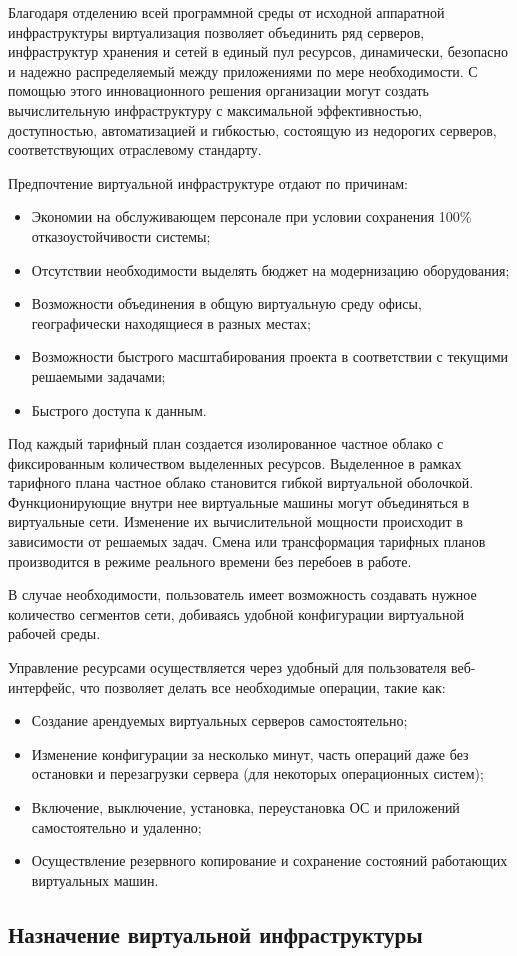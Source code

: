Благодаря отделению всей программной среды от исходной аппаратной инфраструктуры виртуализация позволяет объединить ряд серверов, инфраструктур хранения и сетей в единый пул ресурсов, динамически, безопасно и надежно распределяемый между приложениями по мере необходимости.
С помощью этого инновационного решения организации могут создать вычислительную инфраструктуру с максимальной эффективностью, доступностью, автоматизацией и гибкостью, состоящую из недорогих серверов, соответствующих отраслевому стандарту.

Предпочтение виртуальной инфраструктуре отдают по причинам:
\begin{itemize}
  \item Экономии на обслуживающем персонале при условии сохранения 100\% отказоустойчивости системы;
  \item Отсутствии необходимости выделять бюджет на модернизацию оборудования;
  \item Возможности объединения в общую виртуальную среду офисы, географически находящиеся в разных местах;
  \item Возможности быстрого масштабирования проекта в соответствии с текущими решаемыми задачами;
  \item Быстрого доступа к данным.
\end{itemize}

Под каждый тарифный план создается изолированное частное облако с фиксированным количеством выделенных ресурсов.
Выделенное в рамках тарифного плана частное облако становится гибкой виртуальной оболочкой.
Функционирующие внутри нее виртуальные машины могут объединяться в виртуальные сети.
Изменение их вычислительной мощности происходит в зависимости от решаемых задач.
Смена или трансформация тарифных планов производится в режиме реального времени без перебоев в работе.

В случае необходимости, пользователь имеет возможность создавать нужное количество сегментов сети, добиваясь удобной конфигурации виртуальной рабочей среды.

Управление ресурсами осуществляется через удобный для пользователя веб-интерфейс, что позволяет делать все необходимые операции, такие как:
\begin{itemize}
  \item Создание арендуемых виртуальных серверов самостоятельно;
  \item Изменение конфигурации за несколько минут, часть операций даже без остановки и перезагрузки сервера (для некоторых операционных систем);
  \item Включение, выключение, установка, переустановка ОС и приложений самостоятельно и удаленно;
  \item Осуществление резервного копирование и сохранение состояний работающих виртуальных машин. 
\end{itemize}

\subsection{Назначение виртуальной инфраструктуры}

\clearpage
